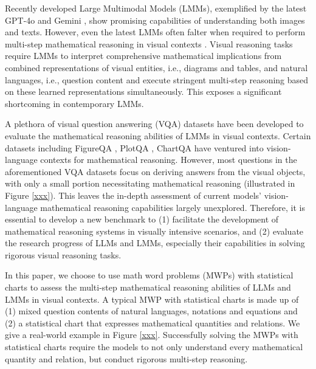Recently developed Large Multimodal Models (LMMs), exemplified by the latest GPT-4o \cite{openai2024gpt4o} and Gemini \cite{team2023gemini}, show promising capabilities of understanding both images and texts. However, even the latest LMMs often falter when required to perform multi-step mathematical reasoning in visual contexts \cite{}. Visual reasoning tasks require LMMs to interpret comprehensive mathematical implications from combined representations of visual entities, i.e., diagrams and tables, and natural languages, i.e., question content and execute stringent multi-step reasoning based on these learned representations simultaneously. This exposes a significant shortcoming in contemporary LMMs.

A plethora of visual question answering (VQA) datasets have been developed to evaluate the mathematical reasoning abilities of LMMs in visual contexts. Certain datasets including FigureQA \cite{kahou2017figureqa}, PlotQA \cite{methani2020plotqa}, ChartQA \cite{masry2022chartqa} have ventured into vision-language contexts for mathematical reasoning. However, most questions in the aforementioned VQA datasets focus on deriving answers from the visual objects, with only a small portion necessitating mathematical reasoning (illustrated in Figure \ref{xxx}). This leaves the in-depth assessment of current models' vision-language mathematical reasoning capabilities largely unexplored. Therefore, it is essential to develop a new benchmark to (1) facilitate the development of mathematical reasoning systems in visually intensive scenarios, and (2) evaluate the research progress of LLMs and LMMs, especially their capabilities in solving rigorous visual reasoning tasks.

In this paper, we choose to use math word problems (MWPs) with statistical charts to assess the multi-step mathematical reasoning abilities of LLMs and LMMs in visual contexts. A typical MWP with statistical charts is made up of (1) mixed question contents of natural languages, notations and equations and (2) a statistical chart that expresses mathematical quantities and relations. We give a real-world example in Figure \ref{xxx}. Successfully solving the MWPs with statistical charts require the models to not only understand every mathematical quantity and relation, but conduct rigorous multi-step reasoning. 
 
